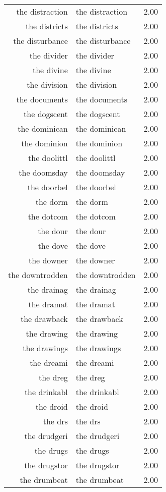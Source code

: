 \begin{table}[ht]
\begin{tabular}{rlr}
  the distraction & the distraction & 2.00 \\ 
  the districts & the districts & 2.00 \\ 
  the disturbance & the disturbance & 2.00 \\ 
  the divider & the divider & 2.00 \\ 
  the divine & the divine & 2.00 \\ 
  the division & the division & 2.00 \\ 
  the documents & the documents & 2.00 \\ 
  the dogscent & the dogscent & 2.00 \\ 
  the dominican & the dominican & 2.00 \\ 
  the dominion & the dominion & 2.00 \\ 
  the doolittl & the doolittl & 2.00 \\ 
  the doomsday & the doomsday & 2.00 \\ 
  the doorbel & the doorbel & 2.00 \\ 
  the dorm & the dorm & 2.00 \\ 
  the dotcom & the dotcom & 2.00 \\ 
  the dour & the dour & 2.00 \\ 
  the dove & the dove & 2.00 \\ 
  the downer & the downer & 2.00 \\ 
  the downtrodden & the downtrodden & 2.00 \\ 
  the drainag & the drainag & 2.00 \\ 
  the dramat & the dramat & 2.00 \\ 
  the drawback & the drawback & 2.00 \\ 
  the drawing & the drawing & 2.00 \\ 
  the drawings & the drawings & 2.00 \\ 
  the dreami & the dreami & 2.00 \\ 
  the dreg & the dreg & 2.00 \\ 
  the drinkabl & the drinkabl & 2.00 \\ 
  the droid & the droid & 2.00 \\ 
  the drs & the drs & 2.00 \\ 
  the drudgeri & the drudgeri & 2.00 \\ 
  the drugs & the drugs & 2.00 \\ 
  the drugstor & the drugstor & 2.00 \\ 
  the drumbeat & the drumbeat & 2.00 \\ 

\end{tabular}
\end{table}

